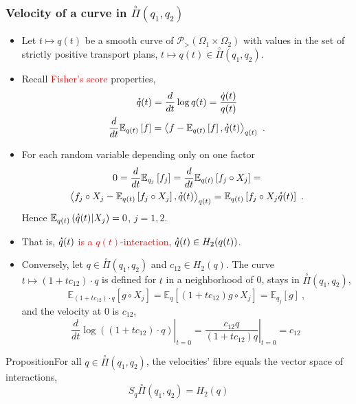 \documentclass[xcolor=svgnames]{beamer}
\newcommand{\condexpat}[3]{\mathbb E_{#1}\left(#2 \middle| #3\right)}
\newcommand{\derivby}[1]{\frac{d}{d#1}}
\newcommand{\expectat}[2]{\mathbb E_{#1}\left[#2\right]}
\newcommand{\logof}[1]{\log\left(#1\right)}
\newcommand{\openplan}[2]{\overset{\circ}\Pi\left(#1,#2\right)}
\newcommand{\opensimplexon}[1]{\mathcal P_>\left(#1\right)}
\newcommand{\rosso}[1]{\textcolor{red}{#1}}
\newcommand{\scalarat}[3]{\left\langle#2,#3\right\rangle_{#1}}
\newcommand{\velocity}[1]{\accentset{\star}{#1}}
\renewcommand{\emph}{\rosso}
\begin{document}
\begin{frame}\small\frametitle{Velocity of a curve in $\openplan{q_1}{q_2}$}

\begin{itemize}

\item Let $t \mapsto q(t)$ be a smooth curve of $\opensimplexon {\Omega_1 \times \Omega_2}$ with values in the set of strictly positive transport plans, 
      $      t \mapsto q(t) \in \openplan{q_1}{q_2}$.
      
    \item Recall \emph{Fisher's score} properties,
    \begin{gather*}
        \velocity q(t) = \derivby t \log q(t) = \frac {\dot q(t)}{q(t)} \\
        \derivby t \expectat {q(t)} f = \scalarat {q(t)} {f - \expectat {q(t)} f}{\velocity q(t)} \ . 
    \end{gather*}
    \item For each random variable depending only on one factor
      \begin{multline*} 0 = \derivby t \expectat {q_j} {f_j} =  \derivby t \expectat {q(t)} {f_j\circ X_j} = \\ \scalarat {q(t)}  {f_j \circ X_j - \expectat {q(t)} {f_j\circ X_j}} {\velocity q(t)} = \expectat {q(t)} {f_j\circ X_j \velocity q(t)} \ . \end{multline*}
Hence $\condexpat {q(t)} {\velocity q(t)} {X_j} = 0$, $j=1,2$.
\item  That is, \emph{$\velocity q(t)$ is a  $q(t)$-interaction}, $\velocity q(t) \in H_2(q(t))$.
\item Conversely, let $q \in \openplan{q_1}{q_2}$ and $c_{12} \in H_2(q)$. The curve $t \mapsto (1+tc_{12}) \cdot q$ is defined for $t$ in a neighborhood of 0, stays in $\openplan{q_1}{q_2}$,
\begin{equation*}
    \expectat {(1+tc_{12}) \cdot q}{g\circ X_j} = \expectat q {(1+tc_{12})g\circ X_j} = \expectat {q_j} g \ ,
\end{equation*}
and the velocity at 0 is $c_{12}$,
\begin{equation*}
   \left. \derivby t \logof{(1+tc_{12}) \cdot q}
\right|_{t=0} = \left. \frac {c_{12} q}{(1+tc_{12})q} \right|_{t=0} = c_{12} \ \end{equation*}
\end{itemize}
\begin{block}{Proposition}For all $q \in \openplan{q_1}{q_2}$, the velocities' fibre equals the vector space of interactions,
\begin{equation*}
S_q \openplan{q_1}{q_2} = H_2(q)
\end{equation*}
\end{block}


\end{frame}
\end{document}
